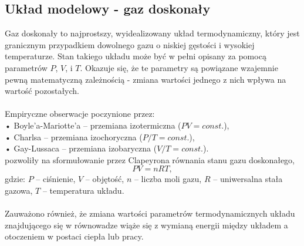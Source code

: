 \documentclass[12pt,a4paper,openright]{report} %
\begin{document}
\subsection{Układ modelowy - gaz doskonały} 
Gaz doskonały to najprostszy, wyidealizowany układ termodynamiczny, który jest granicznym przypadkiem dowolnego gazu o niskiej gęstości i wysokiej temperaturze. Stan takiego układu może być w pełni opisany za pomocą parametrów $P$, $V$, i $T$. Okazuje się, że te parametry są powiązane wzajemnie pewną matematyczną zależnością - zmiana wartości jednego z nich wpływa na wartość pozostałych.\\
\\
Empiryczne obserwacje poczynione przez:\\
• Boyle’a-Mariotte’a – przemiana izotermiczna ($PV=const.$),\\
• Charlsa – przemiana izochoryczna ($P/T=const.$),\\
• Gay-Lussaca – przemiana izobaryczna ($V/T=const.$).\\
pozwoliły na sformułowanie przez Clapeyrona równania stanu gazu doskonałego,
\begin{equation}
PV=nRT,
\end{equation}
gdzie:
$P$ – ciśnienie, $V$ – objętość, $n$ – liczba moli gazu, 
$R$ – uniwersalna stała gazowa, $T$ – temperatura układu.\\
\\
Zauważono również, że zmiana wartości parametrów termodynamicznych układu znajdującego się w równowadze wiąże się z wymianą energii między układem a otoczeniem w postaci ciepła lub pracy.
%
\end{document}
